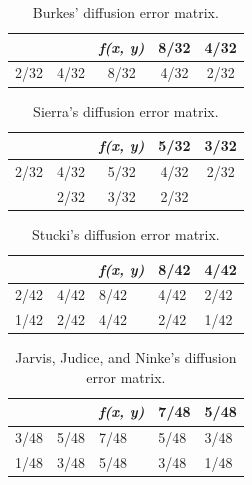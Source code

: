 \documentclass[conference]{IEEEtran}
\begin{document}
\begin{table}[!h]
\centering
\renewcommand{\arraystretch}{1.5}
\begin{tabular}{c|c|c|c|c}
 &  & \textit{f(x, y)} & 8/32 & 4/32 \\ \hline
2/32 & 4/32 & 8/32 & 4/32 & 2/32
\end{tabular}
\caption{Burkes' diffusion error matrix.}
\label{tab:bur}
\end{table}

\begin{table}[!h]
\centering
\renewcommand{\arraystretch}{1.5}
\begin{tabular}{c|c|c|c|c}
 &  & \textit{f(x, y)} & 5/32 & 3/32 \\ \hline
2/32 & 4/32 & 5/32 & 4/32 & 2/32 \\ \hline
 & 2/32 & 3/32 & 2/32 & 
\end{tabular}
\caption{Sierra's diffusion error matrix.}
\label{tab:sie}
\end{table}

\begin{table}[!h]
\centering
\renewcommand{\arraystretch}{1.5}
\begin{tabular}{l|l|l|l|l}
 &  & \textit{f(x, y)} & 8/42 & 4/42 \\ \hline
2/42 & 4/42 & 8/42 & 4/42 & 2/42 \\ \hline
1/42 & 2/42 & 4/42 & 2/42 & 1/42
\end{tabular}
\caption{Stucki's diffusion error matrix.}
\label{tab:stu}
\end{table}

\begin{table}[!h]
\centering
\renewcommand{\arraystretch}{1.5}
\begin{tabular}{l|l|l|l|l}
 &  & \textit{f(x, y)} & 7/48 & 5/48 \\ \hline
3/48 & 5/48 & 7/48 & 5/48 & 3/48 \\ \hline
1/48 & 3/48 & 5/48 & 3/48 & 1/48
\end{tabular}
\caption{Jarvis, Judice, and Ninke's diffusion error matrix.}
\label{tab:jar}
\end{table}
\end{document}
